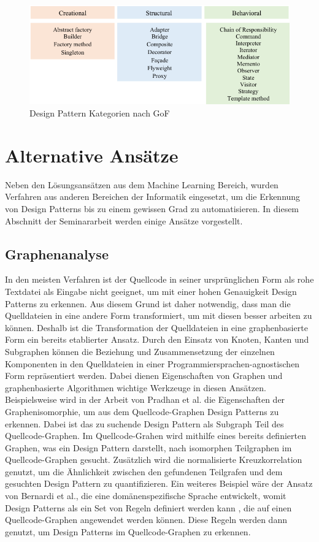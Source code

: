 \documentclass[conference]{IEEEtran}
\begin{document}
\begin{figure}[h]
    \centering
    \includegraphics[width=\linewidth]{imgs/gof.png}
    \caption{Design Pattern Kategorien nach GoF}
\end{figure}


\newpage

\section{Alternative Ansätze}

Neben den Lösungsansätzen aus dem Machine Learning Bereich, wurden Verfahren aus anderen Bereichen der Informatik eingesetzt, um die Erkennung von Design Patterns bis zu einem gewissen Grad zu automatisieren.
In diesem Abschnitt der Seminararbeit werden einige Ansätze vorgestellt.

\subsection{Graphenanalyse}

In den meisten Verfahren ist der Quellcode in seiner ursprünglichen Form als rohe Textdatei als Eingabe nicht geeignet, um mit einer hohen Genauigkeit Design Patterns zu erkennen.
Aus diesem Grund ist daher notwendig, dass man die Quelldateien in eine andere Form transformiert, um mit diesen besser arbeiten zu können. Deshalb ist die Transformation der Quelldateien in eine graphenbasierte Form ein bereits etablierter Ansatz.
Durch den Einsatz von Knoten, Kanten und Subgraphen können die Beziehung und Zusammensetzung der einzelnen Komponenten in den Quelldateien in einer Programmiersprachen-agnostischen Form repräsentiert werden.
Dabei dienen Eigenschaften von Graphen und graphenbasierte Algorithmen wichtige Werkzeuge in diesen Ansätzen. Beispielsweise wird in der Arbeit von Pradhan et al. \cite{PradGraph} die Eigenschaften der Graphenisomorphie, um aus dem Quellcode-Graphen Design Patterns zu erkennen.
Dabei ist das zu suchende Design Pattern als Subgraph Teil des Quellcode-Graphen. Im Quellcode-Grahen wird mithilfe eines bereits definierten Graphen, was ein Design Pattern darstellt, nach isomorphen Teilgraphen im Quellcode-Graphen gesucht.
Zusätzlich wird die normalisierte Kreuzkorrelation genutzt, um die Ähnlichkeit zwischen den gefundenen Teilgrafen und dem gesuchten Design Pattern zu quantifizieren.
Ein weiteres Beispiel wäre der Ansatz von Bernardi et al., die eine domänenspezifische Sprache entwickelt, womit Design Patterns als ein Set von Regeln definiert werden kann \cite{Bernardi2013AMG}, die auf einen Quellcode-Graphen angewendet werden können. Diese Regeln werden dann genutzt, um Design Patterns im Quellcode-Graphen zu erkennen.
\end{document}
